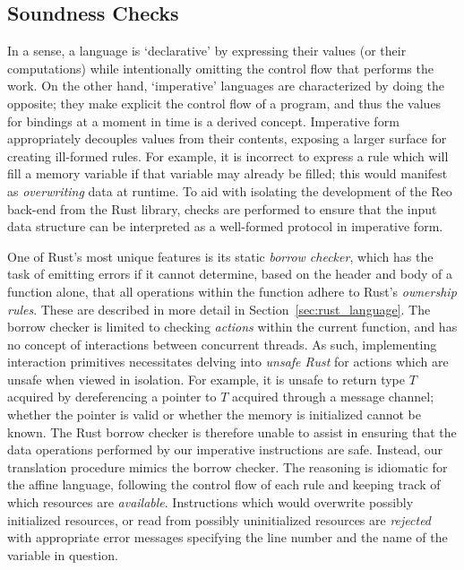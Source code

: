 \subsection{Soundness Checks}
In a sense, a language is `declarative' by expressing their values (or their computations) while intentionally omitting the control flow that performs the work. On the other hand, `imperative' languages are characterized by doing the opposite; they make explicit the control flow of a program, and thus the values for bindings at a moment in time is a derived concept. Imperative form appropriately decouples values from their contents, exposing a larger surface for creating ill-formed rules. For example, it is incorrect to express a rule which will fill a memory variable if that variable may already be filled; this would manifest as \textit{overwriting} data at runtime. To aid with isolating the development of the Reo back-end from the Rust library, checks are performed to ensure that the input data structure can be interpreted as a well-formed protocol in imperative form. 

One of Rust's most unique features is its static \textit{borrow checker}, which has the task of emitting errors if it cannot determine, based on the header and body of a function alone, that all operations within the function adhere to Rust's \textit{ownership rules}. These are described in more detail in Section~\ref{sec:rust_language}. The borrow checker is limited to checking \textit{actions} within the current function, and has no concept of interactions between concurrent threads. As such, implementing interaction primitives necessitates delving into \textit{unsafe Rust} for actions which are unsafe when viewed in isolation. For example, it is unsafe to return type $T$ acquired by dereferencing a pointer to $T$ acquired through a message channel; whether the pointer is valid or whether the memory is initialized cannot be known. The Rust borrow checker is therefore unable to assist in ensuring that the data operations performed by our imperative instructions are safe. Instead, our translation procedure mimics the borrow checker. The reasoning is idiomatic for the affine language, following the control flow of each rule and keeping track of which resources are \textit{available}. Instructions which would overwrite possibly initialized resources, or read from possibly uninitialized resources are \textit{rejected} with appropriate error messages specifying the line number and the name of the variable in question. 

